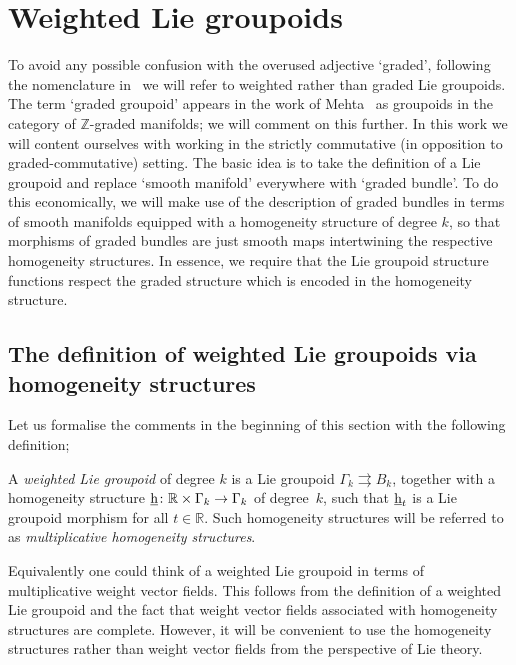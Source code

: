 \documentclass[10pt,a4paper]{amsart}
\newcommand{\rmh}{\textnormal{h}}
\numberwithin{equation}{section}
\begin{document}
\section{Weighted Lie groupoids}\label{sec:weighted Lie groupoids}
To avoid any possible confusion with the overused adjective `graded', following the nomenclature in~\cite{Bruce:2014} we will refer to weighted rather than graded Lie groupoids.  The term  `graded groupoid' appears in the work of Mehta~\cite{Mehta:2006} as groupoids in the category of $\mathbb{Z}$-graded manifolds;  we will comment on this further. In this work we will content ourselves with working in the strictly commutative (in opposition to graded-commutative) setting. The basic idea is to take the def\/inition of a Lie groupoid and replace `smooth manifold' everywhere with `graded bundle'. To do this economically, we will make use of the description of graded bundles in terms of smooth manifolds equipped with a homogeneity structure of degree $k$,  so that morphisms of graded bundles are just smooth maps intertwining the respective homogeneity structures. In essence, we require that  the Lie groupoid structure functions respect the graded structure which is encoded in the homogeneity structure.

\subsection{The def\/inition of weighted Lie groupoids via homogeneity structures}
Let us formalise the comments in the beginning of this section with the following def\/inition;

\begin{Definition}
A \emph{weighted Lie groupoid} of degree $k$ is a Lie groupoid $\Gamma_{k} \rightrightarrows B_{k}$, together with a  homogeneity structure  $\underline{\rmh}\colon  \mathbb{R} \times \Gamma_{k} \rightarrow \Gamma_{k}$ of degree~$k$, such that $\underline{\rmh}_{t}$ is a Lie groupoid morphism for all $t \in \mathbb{R}$. Such homogeneity structures will be referred to as \emph{multiplicative homogeneity structures}.
\end{Definition}

\begin{Remark}
Equivalently one could think of a weighted Lie groupoid in terms of multiplicative weight vector f\/ields. This follows from the def\/inition of a weighted Lie groupoid and the fact that weight vector f\/ields associated with homogeneity structures are complete. However, it will be convenient to use the homogeneity structures rather than weight vector f\/ields from the perspective of Lie theory.
\end{Remark}
\end{document}

